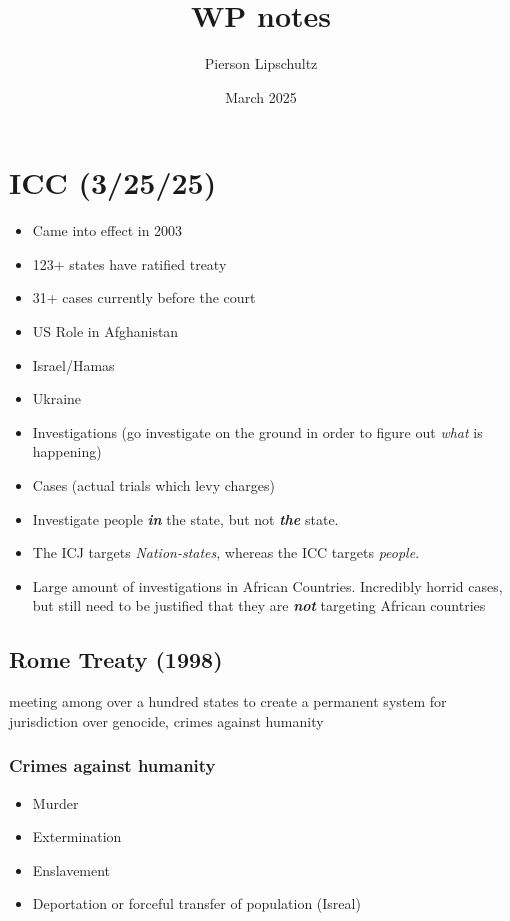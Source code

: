 \documentclass{article}
\title{WP notes}
\author{Pierson Lipschultz}
\date{March 2025}
\begin{document}
        
        

        
\section{ICC (3/25/25)}

\begin{itemize}
    \item Came into effect in 2003
    \item 123+ states have ratified treaty
    \item 31+ cases currently before the court
    \item US Role in Afghanistan
    \item Israel/Hamas
    \item Ukraine 
\end{itemize}
\begin{itemize}
    \item Investigations (go investigate on the ground in order to figure out \textit{what} is happening)
    \item Cases (actual trials which levy charges)
    \item Investigate people \textit{\textbf{in}} the state, but not \textit{\textbf{the}} state.
    \item The ICJ targets \textit{Nation-states}, whereas the ICC targets \textit{people}.
    \item Large amount of investigations in African Countries. Incredibly horrid cases, but still need to be justified that they are \textit{\textbf{not}} targeting African countries
\end{itemize}


\subsection{Rome Treaty (1998)}
meeting among over a hundred states to create a permanent system for jurisdiction over genocide, crimes against humanity

\subsubsection{Crimes against humanity}
\begin{itemize}
    \item Murder
    \item Extermination
    \item Enslavement
    \item Deportation or forceful transfer of population (Isreal)
\end{itemize}
\end{document}
